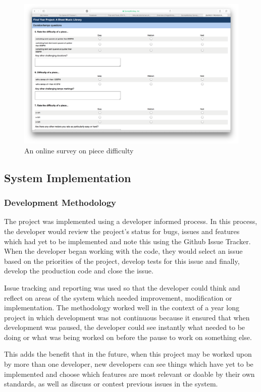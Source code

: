\begin{figure}[H]
\centering
\includegraphics[width=400pt]{survey_difficulty}
\caption{An online survey on piece difficulty}
\label{fig:survey_difficulty}	
\end{figure}



\subsection{System Implementation}
\subsubsection{Development Methodology}
The project was implemented using a developer informed process. In this process, the developer would review the project's status for bugs, issues and features which had yet to be implemented and note this using the Github Issue Tracker. When the developer began working with the code, they would select an issue based on the priorities of the project, develop tests for this issue and finally, develop the production code and close the issue.


Issue tracking and reporting was used so that the developer could think and reflect on areas of the system which needed improvement, modification or implementation. The methodology worked well in the context of a year long project in which development was not continuous because it ensured that when development was paused, the developer could see instantly what needed to be doing or what was being worked on before the pause to work on something else. 

This adds the benefit that in the future, when this project may be worked upon by more than one developer, new developers can see things which have yet to be implemented and choose which features are most relevant or doable by their own standards, as well as discuss or contest previous issues in the system.


